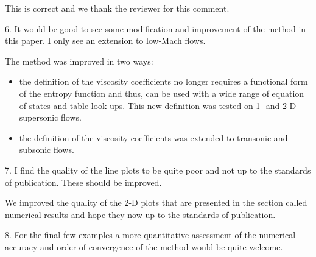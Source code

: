 \documentclass{article}
\begin{document}
This is correct and we thank the reviewer for this comment.
\bigskip


{
\color{blue}
6. It would be good to see some modification and improvement of the
method in this paper. I only see an extension to low-Mach flows.
}

The method was improved in two ways: 
\begin{itemize}
\item the definition of the viscosity coefficients no longer requires a functional form of the entropy function and thus, can be used with a wide range of equation of states and table look-ups. This new definition was tested on 1- and 2-D supersonic flows.
\item the definition of the viscosity coefficients was extended to transonic and subsonic flows.
\end{itemize}
\bigskip


{
\color{blue}
7. I find the quality of the line plots to be quite poor and not up to the
standards of publication. These should be improved.
}

We improved the quality of the 2-D plots that are presented in the section called numerical results and hope they now up to the standards of publication.
\bigskip


{
\color{blue}
8. For the final few examples a more quantitative assessment of the
numerical accuracy and order of convergence of the method would be
quite welcome.
}

\bigskip
\end{document}

